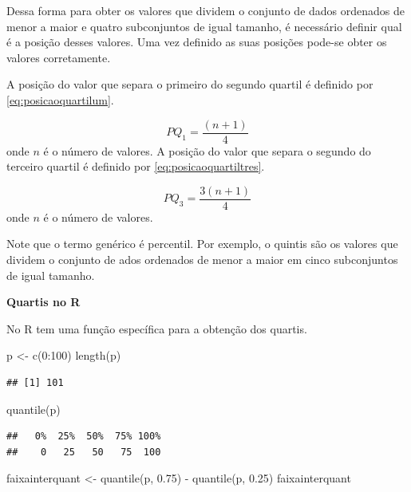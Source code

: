 \documentclass[
]{book}
\newenvironment{Shaded}{\begin{snugshade}}{\end{snugshade}}
\newcommand{\DecValTok}[1]{\textcolor[rgb]{0.00,0.00,0.81}{#1}}
\newcommand{\FloatTok}[1]{\textcolor[rgb]{0.00,0.00,0.81}{#1}}
\newcommand{\FunctionTok}[1]{\textcolor[rgb]{0.00,0.00,0.00}{#1}}
\newcommand{\NormalTok}[1]{#1}
\newcommand{\OtherTok}[1]{\textcolor[rgb]{0.56,0.35,0.01}{#1}}
\newcommand{\SpecialCharTok}[1]{\textcolor[rgb]{0.00,0.00,0.00}{#1}}
\begin{document}
Dessa forma para obter os valores que dividem o conjunto de dados ordenados de menor a maior e quatro subconjuntos de igual tamanho, é necessário definir qual é a posição desses valores. Uma vez definido as suas posições pode-se obter os valores corretamente.

A posição do valor que separa o primeiro do segundo quartil é definido por \eqref{eq:posicaoquartilum}.

\begin{equation}
  PQ_1 = \dfrac{(n +1)}{4}
  \label{eq:posicaoquartilum}
\end{equation}
onde \(n\) é o número de valores.
A posição do valor que separa o segundo do terceiro quartil é definido por \eqref{eq:posicaoquartiltres}.

\begin{equation}
  PQ_3 = \dfrac{3(n +1)}{4}
  \label{eq:posicaoquartiltres}
\end{equation}
onde \(n\) é o número de valores.

Note que o termo genérico é percentil. Por exemplo, o quintis são os valores que dividem o conjunto de ados ordenados de menor a maior em cinco subconjuntos de igual tamanho.

\textbf{Quartis no R}

No R tem uma função específica para a obtenção dos quartis.

\begin{Shaded}
\begin{Highlighting}[]
\NormalTok{p }\OtherTok{\textless{}{-}} \FunctionTok{c}\NormalTok{(}\DecValTok{0}\SpecialCharTok{:}\DecValTok{100}\NormalTok{)}
\FunctionTok{length}\NormalTok{(p)}
\end{Highlighting}
\end{Shaded}

\begin{verbatim}
## [1] 101
\end{verbatim}

\begin{Shaded}
\begin{Highlighting}[]
\FunctionTok{quantile}\NormalTok{(p)}
\end{Highlighting}
\end{Shaded}

\begin{verbatim}
##   0%  25%  50%  75% 100% 
##    0   25   50   75  100
\end{verbatim}

\begin{Shaded}
\begin{Highlighting}[]
\NormalTok{faixainterquant }\OtherTok{\textless{}{-}} \FunctionTok{quantile}\NormalTok{(p, }\FloatTok{0.75}\NormalTok{) }\SpecialCharTok{{-}} \FunctionTok{quantile}\NormalTok{(p, }
    \FloatTok{0.25}\NormalTok{)}
\NormalTok{faixainterquant}
\end{Highlighting}
\end{Shaded}
\end{document}
